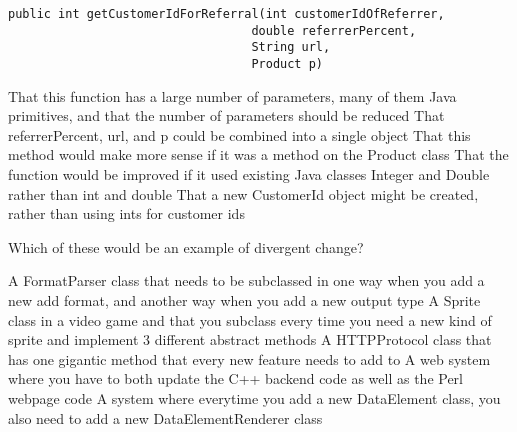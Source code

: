 \documentclass{exam}
\begin{document}
\begin{questions}
\begin{lstlisting}
public int getCustomerIdForReferral(int customerIdOfReferrer, 
                                  double referrerPercent, 
                                  String url, 
                                  Product p) 
\end{lstlisting}
\begin{choices}
\choice That this function has a large number of parameters, many of them Java primitives, and that the number of parameters should be reduced
\choice That referrerPercent, url, and p could be combined into a single object
\choice That this method would make more sense if it was a method on the Product class
\choice That the function would be improved if it used existing Java classes Integer and Double rather than int and double
\choice That a new CustomerId object might be created, rather than using ints for customer ids
\end{choices}



\question[1] Which of these would be an example of divergent change?

\begin{choices}
\choice A FormatParser class that needs to be subclassed in one way when you add a new add format, and another way when you add a new output type
\choice A Sprite class in a video game and that you subclass every time you need a new kind of sprite and implement 3 different abstract methods
\choice A HTTPProtocol class that has one gigantic method that every new feature needs to add to
\choice A web system where you have to both update the C++ backend code as well as the Perl webpage code
\choice A system where everytime you add a new DataElement class, you also need to add a new DataElementRenderer class
\end{choices}


\end{questions}
\end{document}
